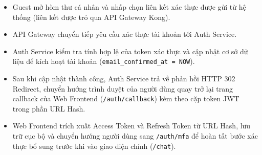 \begin{itemize}
\item Guest mở hòm thư cá nhân và nhấp chọn liên kết xác thực được gửi từ hệ thống (liên kết được trỏ qua API Gateway Kong).
\item API Gateway chuyển tiếp yêu cầu xác thực tài khoản tới Auth Service.
\item Auth Service kiểm tra tính hợp lệ của token xác thực và cập nhật cơ sở dữ liệu để kích hoạt tài khoản (\texttt{email\_confirmed\_at = NOW}).
\item Sau khi cập nhật thành công, Auth Service trả về phản hồi HTTP 302 Redirect, chuyển hướng trình duyệt của người dùng quay trở lại trang callback của Web Frontend (\texttt{/auth/callback}) kèm theo cặp token JWT trong phần URL Hash.
\item Web Frontend trích xuất Access Token và Refresh Token từ URL Hash, lưu trữ cục bộ và chuyển hướng người dùng sang \texttt{/auth/mfa} để hoàn tất bước xác thực bổ sung trước khi vào giao diện chính (\texttt{/chat}).
\end{itemize}
